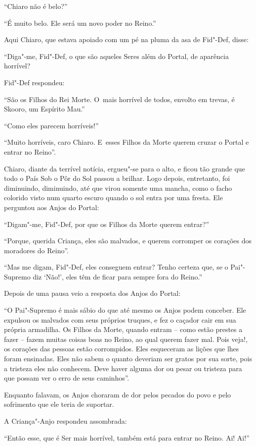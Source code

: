 ``Chiaro não é belo?''

``É muito belo. Ele será um novo poder no Reino.''

Aqui Chiaro, que estava apoiado com um pé na pluma da asa de Fid"-Def,
disse:

``Diga"-me, Fid"-Def, o que são aqueles Seres além do Portal, de aparência
horrível?

Fid"-Def respondeu:

``São os Filhos do Rei Morte. O~mais horrível de todos, envolto em
trevas, é Skooro, um Espírito Mau.''

``Como eles parecem horríveis!''

``Muito horríveis, caro Chiaro. E~esses Filhos da Morte querem cruzar o
Portal e entrar no Reino''.

Chiaro, diante da terrível notícia, ergueu"-se para o alto, e ficou tão
grande que todo o País Sob o Pôr do Sol passou a brilhar. Logo depois,
entretanto, foi diminuindo, diminuindo, até que virou somente uma
mancha, como o facho colorido visto num quarto escuro quando o sol entra
por uma fresta. Ele perguntou aos Anjos do Portal:

``Digam"-me, Fid"-Def, por que os Filhos da Morte querem entrar?''

``Porque, querida Criança, eles são malvados, e querem corromper os
corações dos moradores do Reino''.

``Mas me digam, Fid"-Def, eles conseguem entrar? Tenho certeza que, se o
Pai"-Supremo diz `Não!', eles têm de ficar para sempre fora do Reino.''

Depois de uma pausa veio a resposta dos Anjos do Portal:

``O Pai"-Supremo é mais sábio do que até mesmo os Anjos podem conceber.
Ele expulsou os malvados com seus próprios truques, e fez o caçador cair
em sua própria armadilha. Os Filhos da Morte, quando entram -- como
estão prestes a fazer -- fazem muitas coisas boas no Reino, ao qual
querem fazer mal. Pois veja!, os corações das pessoas estão corrompidos.
Eles esqueceram as lições que lhes foram ensinadas. Eles não sabem o
quanto deveriam ser gratos por sua sorte, pois a tristeza eles não
conhecem. Deve haver alguma dor ou pesar ou tristeza para que possam ver
o erro de seus caminhos''.

Enquanto falavam, os Anjos choraram de dor pelos pecados do povo e pelo
sofrimento que ele teria de suportar.

A Criança"-Anjo respondeu assombrada:

``Então esse, que é Ser mais horrível, também está para entrar no
Reino. Ai! Ai!''

